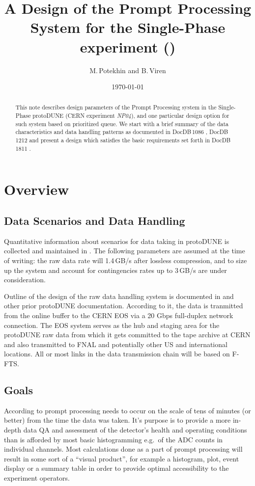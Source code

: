 \documentclass[pdftex,12pt,letter]{article}
\title{A Design of the Prompt Processing System for the Single-Phase \pd experiment (\expname)}
\date{\today}
\author{M.\,Potekhin and B.\,Viren}
\newcommand{\pd}{protoDUNE\xspace}
\newcommand{\expname}{\textit{NP04}\xspace}
\begin{document}
\maketitle

\begin{abstract}
\noindent  This note describes design parameters of
the Prompt Processing system in the Single-Phase \pd
(CERN experiment \expname), and one particular design option for such system
based on prioritized queue. We start with a brief summary of the data characteristics and data handling patterns
as documented in DocDB\,1086 \cite{docdb1086}, DocDB\,1212 \cite{docdb1212} and present a design which
satisfies the basic requirements set forth in  DocDB 1811 \cite{docdb1811}.
\end{abstract}


\section{Overview}
\subsection{Data Scenarios and Data Handling}
\label{sec:rawdata}
Quantitative information about scenarios for data taking in \pd is collected and maintained in \cite{docdb1086}. The following parameters
are assumed at the time of writing: the raw data rate will 1.4\,GB/s after lossless compression, and to size up
the system and account for contingencies rates up to 3\,GB/s are under consideration.

Outline of the design of the raw data handling system is documented in  \cite{docdb1212} and other prior \pd documentation.
According to it, the data is tranmitted from the online buffer to the CERN EOS via a 20 Gbps full-duplex network connection.
The EOS system serves as the hub and staging area for the \pd raw data from which
it gets committed to the tape archive at CERN and also transmitted to FNAL and potentially
other US and international locations. All or most links in the data transmission chain will be based on F-FTS.

\subsection{Goals}
\label{sec:outline}
According to \cite{docdb1811}  prompt processing needs to occur on the scale
of tens of minutes (or better) from the time the data was taken. It's purpose is to
provide a more in-depth data QA and assessment of the detector's health and operating conditions
than is afforded by most basic histogramming e.g.~of the ADC counts in individual channels. Most calculations
done as a part of prompt processing will result in some sort of a ``visual product'', for example a histogram,
plot, event display or a summary table in order to provide optimal accessibility to the experiment
operators.
\end{document}
